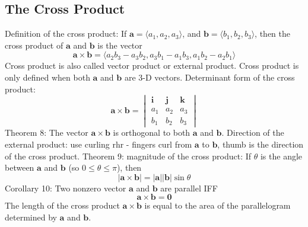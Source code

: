 \documentclass{article}
\begin{document}
\begin{multicols}{2}
\begin{outline}
    \end{outline} 
    \subsection{The Cross Product}
    \begin{outline}
        \1 Definition of the cross product: If \(\mathbf a=\langle a_1,a_2,a_3\rangle\), and \(\mathbf b=\langle b_1,b_2,b_3\rangle\), then the cross product of \(\mathbf a\) and \(\mathbf b\) is the vector \[\mathbf{a\times b}=\langle a_2b_3-a_3b_2,a_3b_1-a_1b_3,a_1b_2-a_2b_1\rangle\]
        \1 Cross product is also called vector product or external product. 
        \1 Cross product is only defined when both \(\mathbf a\) and \(\mathbf b\) are 3-D vectors. 
        \1 Determinant form of the cross product: \[\mathbf{a\times b}=\begin{vmatrix}
            \mathbf i & \mathbf j & \mathbf k\\
            a_1 & a_2 & a_3\\
            b_1 & b_2 & b_3
        \end{vmatrix}\]
        \1 Theorem 8: The vector \(\mathbf{a\times b}\) is orthogonal to both \(\mathbf a\) and \(\mathbf b\). 
        \1 Direction of the external product: use curling rhr - fingers curl from \(\mathbf a\) to \(\mathbf b\), thumb is the direction of the cross product. 
        \1 Theorem 9: magnitude of the cross product: If \(\theta\) is the angle between \(\mathbf a\) and \(\mathbf b\) (so \(0\leq\theta\leq\pi\)), then \[|\mathbf{a\times b}|=|\mathbf a||\mathbf b|\sin\theta\]
        \1 Corollary 10: Two nonzero vector \(\mathbf a\) and \(\mathbf b\) are parallel IFF \[\mathbf{a\times b}=\mathbf 0\]
        \1 The length of the cross product \(\mathbf{a\times b}\) is equal to the area of the parallelogram determined by \(\mathbf a\) and \(\mathbf b\). 
    \end{outline}\end{multicols}
\end{document}
